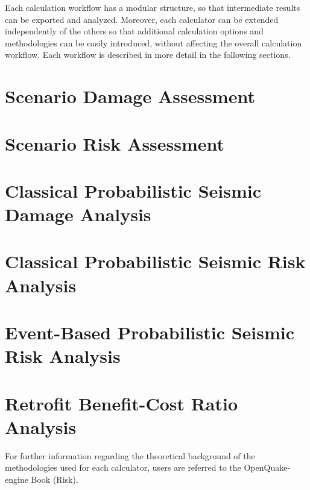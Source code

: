 Each calculation workflow has a modular structure, so that intermediate
results can be exported and analyzed. Moreover, each calculator can be
extended independently of the others so that additional calculation options
and methodologies can be easily introduced, without affecting the overall
calculation workflow. Each workflow is described in more detail in the
following sections.

\section{Scenario Damage Assessment}
\label{sec:workflow_scenario_damage}


\section{Scenario Risk Assessment}
\label{sec:workflow_scenario_risk}


\section{Classical Probabilistic Seismic Damage Analysis}
\label{sec:workflow_classical_damage}


\section{Classical Probabilistic Seismic Risk Analysis}
\label{sec:workflow_classical_risk}


\section{Event-Based Probabilistic Seismic Risk Analysis}
\label{sec:workflow_event_based_risk}


\section{Retrofit Benefit-Cost Ratio Analysis}
\label{sec:workflow_benefit_cost}


For further information regarding the theoretical background of the
methodologies used for each calculator, users are referred to the OpenQuake-
engine Book (Risk).

\cleardoublepage